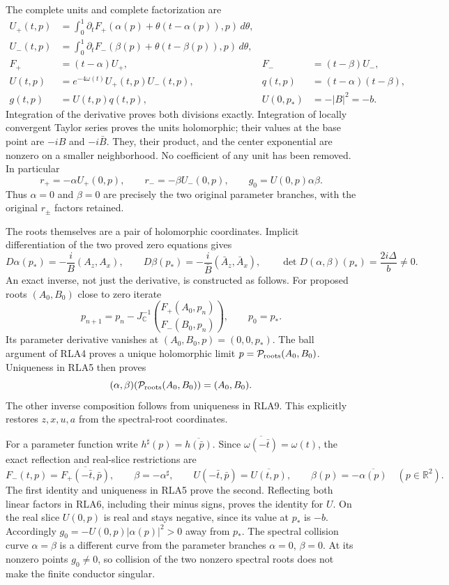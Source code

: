 The complete units and complete factorization are
\[
\begin{aligned}
 U_+(t,p)&=\int_0^1\partial_tF_+
       (\alpha(p)+\theta(t-\alpha(p)),p)\,d\theta,\\
 U_-(t,p)&=\int_0^1\partial_tF_-
       (\beta(p)+\theta(t-\beta(p)),p)\,d\theta,\\
 F_+&=(t-\alpha)U_+,&F_-&=(t-\beta)U_-,\\
 U(t,p)&=e^{-4\omega(t)}U_+(t,p)U_-(t,p),&
 q(t,p)&=(t-\alpha)(t-\beta),\\
 g(t,p)&=U(t,p)q(t,p),&U(0,p_*)&=-|B|^2=-b.
\end{aligned}\tag{RLA6}
\]
Integration of the derivative proves both divisions exactly.
Integration of locally convergent Taylor series proves the units
holomorphic; their values at the base point are $-iB$ and
$-i\bar B$.  They, their product, and the center exponential are
nonzero on a smaller neighborhood.  No coefficient of any unit
has been removed.  In particular
\[
 r_+=-\alpha U_+(0,p),\qquad r_-=-\beta U_-(0,p),\qquad
 g_0=U(0,p)\alpha\beta.
 \tag{RLA7}
\]
Thus $\alpha=0$ and $\beta=0$ are precisely the two original
parameter branches, with the original $r_\pm$ factors retained.

The roots themselves are a pair of holomorphic coordinates.  Implicit
differentiation of the two proved zero equations gives
\[
 D\alpha(p_*)=-\frac{i}{B}(A_z,A_x),\qquad
 D\beta(p_*)=-\frac{i}{\bar B}(\bar A_z,\bar A_x),\qquad
 \det D(\alpha,\beta)(p_*)=\frac{2i\Delta}{b}\ne0.
 \tag{RLA8}
\]
An exact inverse, not just the derivative, is constructed as follows.
For proposed roots $(A_0,B_0)$ close to zero iterate
\[
 p_{n+1}=p_n-J_{\mathbb C}^{-1}
       \binom{F_+(A_0,p_n)}{F_-(B_0,p_n)},\qquad p_0=p_*.
 \tag{RLA9}
\]
Its parameter derivative vanishes at $(A_0,B_0,p)=(0,0,p_*)$.
The ball argument of RLA4 proves a unique holomorphic limit
$p=\mathcal P_{\rm roots}(A_0,B_0)$.
Uniqueness in RLA5 then proves
\[ (\alpha,\beta)(\mathcal P_{\rm roots}(A_0,B_0))=(A_0,B_0). \]
The other inverse composition follows from uniqueness in RLA9.
This explicitly restores $z,x,u,a$ from the spectral-root coordinates.

For a parameter function write $h^\sharp(p)=\overline{h(\bar p)}$.
Since $\overline{\omega(-\bar t)}=\omega(t)$, the exact reflection
and real-slice restrictions are
\[
 F_-(t,p)=\overline{F_+(-\bar t,\bar p)},\qquad
 \beta=-\alpha^\sharp,\qquad
 U(-\bar t,\bar p)=\overline{U(t,p)},\qquad
 \beta(p)=-\overline{\alpha(p)}\quad(p\in\mathbb R^2).
 \tag{RLA10}
\]
The first identity and uniqueness in RLA5 prove the second.
Reflecting both linear factors in RLA6, including their minus signs,
proves the identity for $U$.  On the real slice $U(0,p)$ is real
and stays negative, since its value at $p_*$ is $-b$.
Accordingly $g_0=-U(0,p)|\alpha(p)|^2>0$ away from $p_*$.
The spectral collision curve $\alpha=\beta$ is a different curve
from the parameter branches $\alpha=0$, $\beta=0$.
At its nonzero points $g_0\ne0$, so collision of the two nonzero
spectral roots does not make the finite conductor singular.

